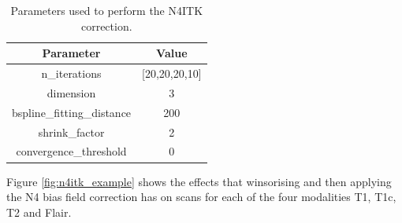 \documentclass[12pt,a4paper,twoside,openright]{report}
\begin{document}
\begin{table}[h]
\centering	
\begin{tabular}{ c c } 
\textbf{Parameter} & \textbf{Value} \\
 \hline
 n\_iterations & [20,20,20,10] \\ 
 dimension & 3 \\
 bspline\_fitting\_distance & 200 \\
 shrink\_factor & 2\\
 convergence\_threshold & 0
\end{tabular}
\caption{Parameters used to perform the N4ITK correction.}
\label{table:n4_params}
\end{table}

Figure \ref{fig:n4itk_example} shows the effects that winsorising and then applying the N4 bias field correction has on scans for each of the four modalities T1, T1c, T2 and Flair.
\end{document}
